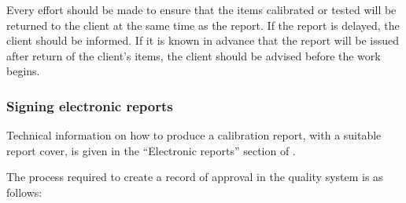 Every effort should be made to ensure that the items calibrated or tested will be returned to the client at the same time as the report. If the report is delayed, the client should be informed. If it is known in advance that the report will be issued after return of the client's items, the client should be advised before the work begins.

\subsubsection{Signing electronic reports}
\label{sss:electronic_signatures}
Technical information on how to produce a calibration report, with a suitable report cover, is given in the ``Electronic reports''  section of \cite[\S\ref*{GRP-ss:electronic_reports}]{MSL_Reporting_Guidelines}.

The process required to create a record of approval in the quality system is as follows:

